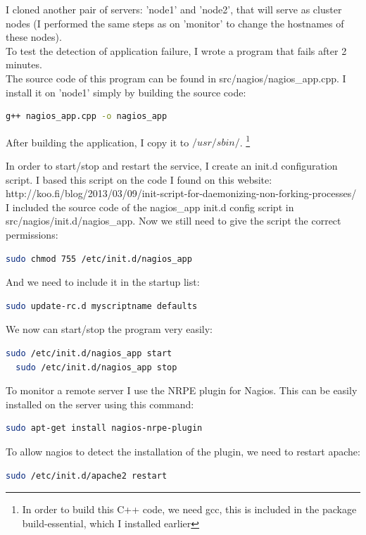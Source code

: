\documentclass[12pt]{report}
\begin{document}
I cloned another pair of servers: 'node1' and 'node2', that will serve as
cluster nodes (I performed the same steps as on 'monitor' to change
the hostnames of these nodes).\\

To test the detection of application failure, I wrote a program that
fails after 2 minutes. \\

The source code of this program can be found in src/nagios/nagios\_app.cpp.
I install it on 'node1' simply by building the source code:
\begin{lstlisting}[language=bash]
  g++ nagios_app.cpp -o nagios_app 
\end{lstlisting} 
After building the application, I copy it to $/usr/sbin/$.
\footnote{In order to build this C++ code, we need gcc, this is included
in the package build-essential, which I installed earlier}

In order to start/stop and restart the service, I create an init.d
configuration script.
I based this script on the code I found on this website: 
http://koo.fi/blog/2013/03/09/init-script-for-daemonizing-non-forking-processes/
I included the source code of the nagios\_app init.d config script in src/nagios/init.d/nagios\_app.
Now we still need to give the script the correct permissions:
\begin{lstlisting}[language=bash]
  sudo chmod 755 /etc/init.d/nagios_app
\end{lstlisting} 
And we need to include it in the startup list:
\begin{lstlisting}[language=bash]
  sudo update-rc.d myscriptname defaults
\end{lstlisting}

We now can start/stop the program very easily:
\begin{lstlisting}[language=bash]
  sudo /etc/init.d/nagios_app start
  sudo /etc/init.d/nagios_app stop
\end{lstlisting}

To monitor a remote server I use the NRPE plugin for Nagios. 
This can be easily installed on the server using this command:
\begin{lstlisting}[language=bash]
  sudo apt-get install nagios-nrpe-plugin
\end{lstlisting} 

To allow nagios to detect the installation of the plugin, we need to
restart apache:
\begin{lstlisting}[language=bash]
  sudo /etc/init.d/apache2 restart
\end{lstlisting} 
\end{document}
